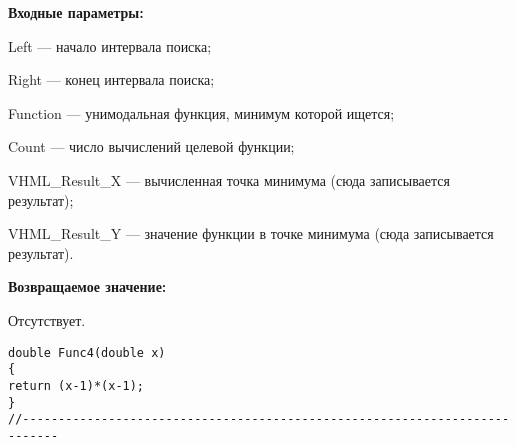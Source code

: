 \textbf{Входные параметры:}

 Left --- начало интервала поиска;
 
Right --- конец интервала поиска;
 
Function --- унимодальная функция, минимум которой ищется;
 
Count --- число вычислений целевой функции;
 
VHML\_Result\_X --- вычисленная точка минимума (сюда записывается результат);
 
VHML\_Result\_Y --- значение функции в точке минимума (сюда записывается результат).

\textbf{Возвращаемое значение:}
 
 Отсутствует.

\begin{lstlisting}[caption=Оптимизируемая функция]
double Func4(double x)
{
return (x-1)*(x-1);
}
//---------------------------------------------------------------------------
\end{lstlisting}